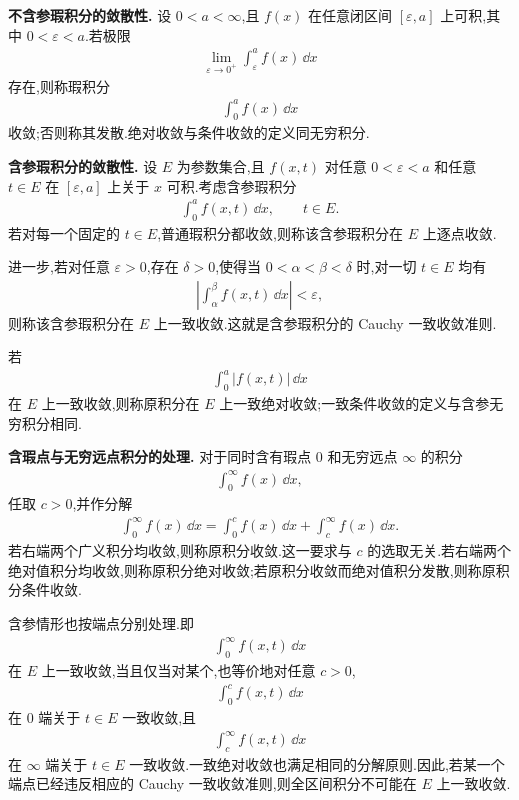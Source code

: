 \textbf{不含参瑕积分的敛散性.}
设 $0<a<\infty$,且 $f(x)$ 在任意闭区间 $[\varepsilon,a]$ 上可积,其中 $0<\varepsilon<a$.若极限
\begin{align*}
	\lim_{\varepsilon\to0^+}\int_\varepsilon^a f(x)\,\dd x
\end{align*}
存在,则称瑕积分
\begin{align*}
	\int_0^a f(x)\,\dd x
\end{align*}
收敛;否则称其发散.绝对收敛与条件收敛的定义同无穷积分.

\textbf{含参瑕积分的敛散性.}
设 $E$ 为参数集合,且 $f(x,t)$ 对任意 $0<\varepsilon<a$ 和任意 $t\in E$ 在 $[\varepsilon,a]$ 上关于 $x$ 可积.考虑含参瑕积分
\begin{align*}
	\int_0^a f(x,t)\,\dd x,
	\qquad t\in E.
\end{align*}
若对每一个固定的 $t\in E$,普通瑕积分都收敛,则称该含参瑕积分在 $E$ 上逐点收敛.

进一步,若对任意 $\varepsilon>0$,存在 $\delta>0$,使得当 $0<\alpha<\beta<\delta$ 时,对一切 $t\in E$ 均有
\begin{align*}
	\left|\int_\alpha^\beta f(x,t)\,\dd x\right|<\varepsilon,
\end{align*}
则称该含参瑕积分在 $E$ 上一致收敛.这就是含参瑕积分的 Cauchy 一致收敛准则.

若
\begin{align*}
	\int_0^a |f(x,t)|\,\dd x
\end{align*}
在 $E$ 上一致收敛,则称原积分在 $E$ 上一致绝对收敛;一致条件收敛的定义与含参无穷积分相同.

\textbf{含瑕点与无穷远点积分的处理.}
对于同时含有瑕点 $0$ 和无穷远点 $\infty$ 的积分
\begin{align*}
	\int_0^\infty f(x)\,\dd x,
\end{align*}
任取 $c>0$,并作分解
\begin{align*}
	\int_0^\infty f(x)\,\dd x
	=
	\int_0^c f(x)\,\dd x+
	\int_c^\infty f(x)\,\dd x.
\end{align*}
若右端两个广义积分均收敛,则称原积分收敛.这一要求与 $c$ 的选取无关.若右端两个绝对值积分均收敛,则称原积分绝对收敛;若原积分收敛而绝对值积分发散,则称原积分条件收敛.

含参情形也按端点分别处理.即
\begin{align*}
	\int_0^\infty f(x,t)\,\dd x
\end{align*}
在 $E$ 上一致收敛,当且仅当对某个,也等价地对任意 $c>0$,
\begin{align*}
	\int_0^c f(x,t)\,\dd x
\end{align*}
在 $0$ 端关于 $t\in E$ 一致收敛,且
\begin{align*}
	\int_c^\infty f(x,t)\,\dd x
\end{align*}
在 $\infty$ 端关于 $t\in E$ 一致收敛.一致绝对收敛也满足相同的分解原则.因此,若某一个端点已经违反相应的 Cauchy 一致收敛准则,则全区间积分不可能在 $E$ 上一致收敛.

